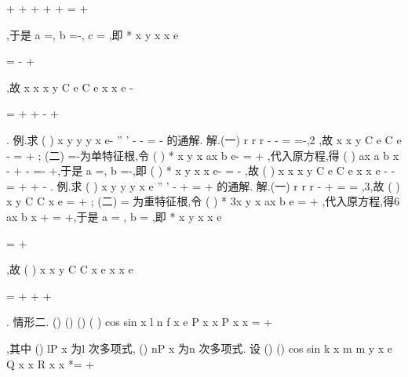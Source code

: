 +
+
+
+
+
=
+




,于是
a =,
b =-,
c =
,即 
*
x
y
x
x
e


=
-
+




,故
x
x
x
y
C e
C e
x
x
e
-


=
+
+
-
+




. 
\textcolor{lyred}{例}.求
(
)
x
y
y
y
x e-
''
'
-
-
=
-
的通解. 
解.(一)
r
r
r
-
-
=
\Rightarrow 
=-,2 ,故
x
x
y
C e
C e
-
=
+
; 
(二)
\lambda =-为单特征根,令
(
)
*
x
y
x ax
b e-
=
+
,代入原方程,得 
(
)
ax
a
b
x
-
+
-
=-
+,于是
a =,
b =-,即
(
)
*
x
y
x
x e-
=
-
,故 
(
)
x
x
x
y
C e
C e
x
x e
-
-
=
+
+
-
. 
\textcolor{lyred}{例}.求
(
)
x
y
y
y
x
e
''
'
-
+
=
+
的通解. 
解.(一)
r
r
r
-
+
=
\Rightarrow 
=
,3,故
(
)
x
y
C
C x e
=
+
; 
(二)
\lambda =
为重特征根,令
(
)
*
3x
y
x
ax
b e
=
+
,代入原方程,得6
ax
b
x
+
=
+,于是 
a =
,
b =
,即
*
x
y
x
x
e


=
+




,故
(
)
x
x
y
C
C x e
x
x
e


=
+
+
+




. 
\textcolor{lyred}{情形二}.
()
()
()
(
)
cos
sin
x
l
n
f x
e
P x
x
P
x
x
\lambda 
\omega 
\omega 
\omega 
=
+
\neq 




,其中
()
lP x 为l 次多项式, 
()
nP x 为n 次多项式. 
设
()
()
cos
sin
k
x
m
m
y
x e
Q
x
x
R
x
x
\lambda 
\omega 
\omega 
*=
+



